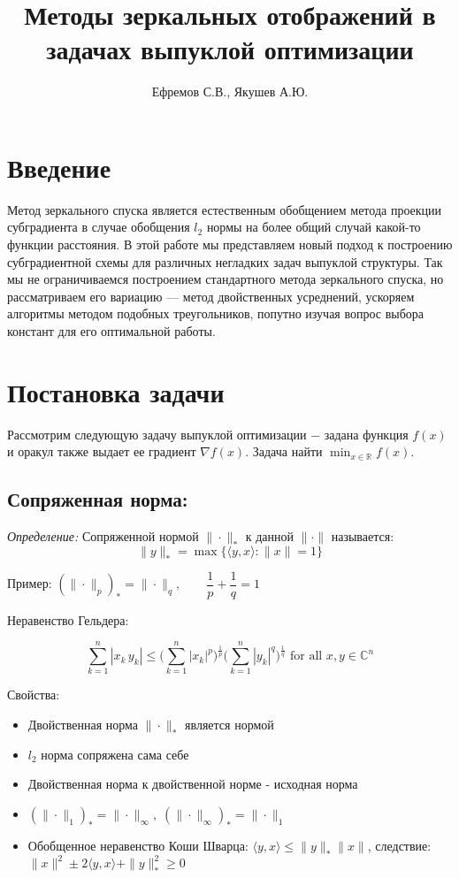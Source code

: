 \documentclass[a4paper,12pt]{article}
\author{
	Ефремов С.В., Якушев А.Ю.}
\title{Методы зеркальных отображений в задачах выпуклой оптимизации}
\theoremstyle{plain} %
\theoremstyle{definition} %
\theoremstyle{remark} %
\theoremstyle{definition}
\theoremstyle{definition}
\let\leq\leqslant
\let\geq\geqslant
\def\RR{\mathbb R}
\begin{document}
	\maketitle
	
	
	\section{Введение}
	Метод зеркального спуска является естественным обобщением метода проекции субградиента в случае обобщения $l_2$ нормы на более общий случай какой-то функции расстояния. В этой работе мы представляем новый подход к построению субградиентной схемы для различных негладких задач выпуклой структуры. Так мы не ограничиваемся построением стандартного метода зеркального спуска, но рассматриваем его вариацию --- метод двойственных усреднений, ускоряем алгоритмы методом подобных треугольников, попутно изучая вопрос выбора констант для его оптимальной работы.
	\section{Постановка задачи}
	
	
	
	Рассмотрим следующую задачу выпуклой оптимизации $-$ задана функция $f(x)$ и оракул также выдает ее градиент $\nabla f(x)$. Задача найти $\min_{x\in \RR} f(x)$.
	
	\subsection{Сопряженная норма:}
	
	\textit{Определение:} Сопряженной нормой $\|\cdot\|_*$ к данной $\|\cdot\|$ называется:
$$
\|y\|_* = \max \{\langle y,x\rangle: \|x\|=1 \}
$$

Пример: $(\|\cdot \|_p)_* = \|\cdot \|_q, \qquad \dfrac{1}{p} + \dfrac{1}{q} = 1$

Неравенство Гельдера:

$$
\sum_{k=1}^n |x_k\,y_k| \le \biggl( \sum_{k=1}^n |x_k|^p \biggr)^{\frac{1}{p}} \biggl( \sum_{k=1}^n |y_k|^q \biggr)^{\frac{1}{q}}
\text{ for all }x, y \in \mathbb{C}^n
$$

Свойства:
\begin{itemize}
\item Двойственная норма $\|\cdot\|_*$ является нормой
\item $l_2$ норма сопряжена сама себе
\item Двойственная норма к двойственной норме - исходная норма
\item $(\|\cdot\|_1)_* = \|\cdot\|_\infty, \;(\|\cdot\|_\infty)_* = \|\cdot\|_1$
\item Обобщенное неравенство Коши Шварца: $\langle y,x \rangle \leq \|y\|_*\|x\|$, следствие: $\|x\|^2 \pm 2 \langle y,x \rangle + \|y\|_*^2 \geq 0$
\end{itemize}
\end{document}

